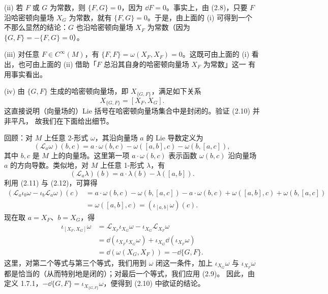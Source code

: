(ii) 若 $F$ 或 $G$ 为常数，则 $\{F,G\}=0$，因为 $\dd F=0$。事实上，由 (2.8)，只要
$F$ 沿哈密顿向量场 $X_G$ 为常数，就有 $\{F,G\}=0$。于是，由上面的 (i) 可得到一个
不那么显然的结论：$G$ 也沿哈密顿向量场 $X_F$ 为常数（因为
$\{G,F\}=-\{F,G\}=0$）。

(iii) 对任意 $F\in C^\infty(M)$，有 $\{F,F\}=\omega(X_F,X_F)=0$。这既可由上面的
(i) 看出，也可由上面的 (ii) 借助「$F$ 总沿其自身的哈密顿向量场 $X_F$ 为常数」这一
有用事实看出。

(iv) 由 $\{G,F\}$ 生成的哈密顿向量场，即 $X_{\{G,F\}}$，满足如下关系
\begin{equation}
  X_{\{G,F\}}=[X_F,X_G].
  \tag{2.10}
\end{equation}
这直接说明（向量场的）Lie 括号在哈密顿向量场集合中是封闭的。验证 (2.10) 并非平凡，
故我们在下面给出细节。

回顾：对 $M$ 上任意 2-形式 $\omega$，其沿向量场 $a$ 的 Lie 导数定义为
\begin{equation}
  (\mathcal{L}_a\omega)(b,c)
  =a\cdot\omega(b,c)-\omega([a,b],c)-\omega(b,[a,c]),
  \tag{2.11}
\end{equation}
其中 $b,c$ 是 $M$ 上的向量场。这里第一项 $a\cdot\omega(b,c)$ 表示函数 $\omega(b,c)$
沿向量场 $a$ 的方向导数。类似地，对 $M$ 上任意 1-形式 $\lambda$，有
\begin{equation}
  (\mathcal{L}_a\lambda)(b)=a\cdot\lambda(b)-\lambda([a,b]).
  \tag{2.12}
\end{equation}
利用 (2.11) 与 (2.12)，可算得
\begin{align*}
  (\mathcal{L}_a\iota_b\omega-\iota_b\mathcal{L}_a\omega)(c)
  &=a\cdot\omega(b,c)-\omega(b,[a,c])-a\cdot\omega(b,c)+\omega([a,b],c)
    +\omega(b,[a,c])\\
  &=\omega([a,b],c)=(\iota_{[a,b]}\omega)(c).
\end{align*}
现在取 $a=X_F$、$b=X_G$，得
\begin{align*}
  \iota_{[X_F,X_G]}\omega
  &=\mathcal{L}_{X_F}\iota_{X_G}\omega-\iota_{X_G}\mathcal{L}_{X_F}\omega\\
  &=\dd(\iota_{X_F}\iota_{X_G}\omega)+\iota_{X_G}\dd(\iota_{X_F}\omega)\\
  &=\dd(\omega(X_G,X_F))=-\dd\{G,F\}.
\end{align*}
这里，对第二个等式与第三个等式，我们用到 $\omega$ 闭这一条件，加上 $\iota_{X_G}\omega$
与 $\iota_{X_F}\omega$ 都是恰当的（从而特别地是闭的）；对最后一个等式，我们应用 (2.9)。
因此，由定义 1.7.1，$-\dd\{G,F\}=\iota_{X_{\{G,F\}}}\omega$，便得到 (2.10) 中欲证的结论。

